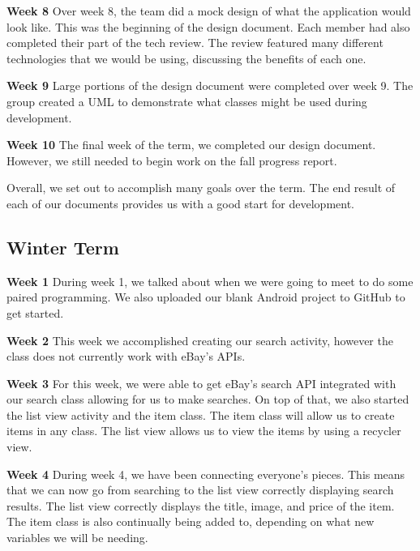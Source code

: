 \documentclass[journal,compsoc, 10pt, draftclsnofoot, onecolumn]{IEEEtran}
\begin{document}
\textbf{Week 8}\newline
Over week 8, the team did a mock design of what the application would look like. 
This was the beginning of the design document. Each member had also completed 
their part of the tech review. The review featured many different technologies that 
we would be using, discussing the benefits of each one. \newline

\textbf{Week 9}\newline
Large portions of the design document were completed over week 9. The group 
created a UML to demonstrate what classes might be used during development. 
\newline

\textbf{Week 10}\newline
The final week of the term, we completed our design document. However, we still 
needed to begin work on the fall progress report. \newline

Overall, we set out to accomplish many goals over the term. The end result of 
each of our documents provides us with a good start for development. 

\subsection{Winter Term}
\textbf{Week 1}\newline
During week 1, we talked about when we were going to meet to do some paired 
programming. We also uploaded our blank Android project to GitHub to get 
started. \newline

\textbf{Week 2}\newline
This week we accomplished creating our search activity, however the class does 
not currently work with eBay's APIs. \newline

\textbf{Week 3}\newline
For this week, we were able to get eBay's search API integrated with our 
search class allowing for us to make searches. On top of that, we also started 
the list view activity and the item class. The item class will allow us to create 
items in any class. The list view allows us to view the items by using a recycler 
view.\newline

\textbf{Week 4}\newline
During week 4, we have been connecting everyone's pieces. This means that we 
can now go from searching to the list view correctly displaying search results. 
The list view correctly displays the title, image, and price of the item. The 
item class is also continually being added to, depending on what new variables
we will be needing. \newline
\end{document}
